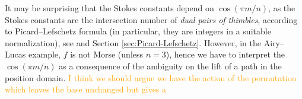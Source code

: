 \documentclass{article}
\theoremstyle{definition}
\newcommand{\laplace}{\mathcal{L}}
\theoremstyle{plain}
\begin{document}
It may be surprising that the Stokes constants depend on $\cos(\pi m/n)$, as the Stokes constants are the intersection number of \textit{dual pairs of thimbles}, according to Picard--Lefschetz formula (in particular, they are integers in a suitable normalization), see \cite[Section 5]{pham} and Section \ref{sec:Picard-Lefschetz}. However, in the Airy--Lucas example, $f$ is not Morse (unless $n=3$), hence we have to interpret the $\cos(\pi m/n)$ as a consequence of the ambiguity on the lift of a path in the position domain. \textcolor{orange}{ I think we should argue we have the action of the permutation which leaves the base unchanged but gives a } 






\end{document}
